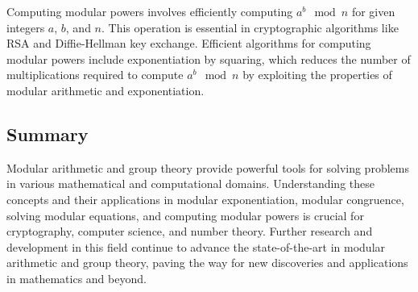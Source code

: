 \documentclass{article}
\renewcommand{\_}{\ifincsname_\else\legacyunderscore\fi}
\begin{document}
Computing modular powers involves efficiently computing \(a^b \mod{n}\) for given integers \(a\), \(b\), and \(n\). This operation is essential in cryptographic algorithms like RSA and Diffie-Hellman key exchange. Efficient algorithms for computing modular powers include exponentiation by squaring, which reduces the number of multiplications required to compute \(a^b \mod{n}\) by exploiting the properties of modular arithmetic and exponentiation.

\subsection{Summary}
Modular arithmetic and group theory provide powerful tools for solving problems in various mathematical and computational domains. Understanding these concepts and their applications in modular exponentiation, modular congruence, solving modular equations, and computing modular powers is crucial for cryptography, computer science, and number theory. Further research and development in this field continue to advance the state-of-the-art in modular arithmetic and group theory, paving the way for new discoveries and applications in mathematics and beyond.
\end{document}
